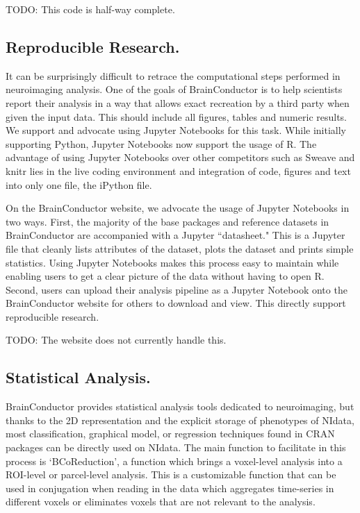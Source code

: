 \documentclass{nature}
\begin{document}
{\color{red}TODO: This code is half-way complete.} 

\subsection{Reproducible Research.}

It can be surprisingly difficult to retrace the computational steps performed
in neuroimaging analysis. One of the goals of BrainConductor is to help
scientists report their analysis in a way that allows exact recreation by
a third party when given the input data. This should include all figures,
tables and numeric results. We support and advocate using Jupyter Notebooks for
this task. While initially supporting Python, Jupyter Notebooks now support 
the usage of R. The advantage of using Jupyter Notebooks over other competitors 
such as Sweave and knitr lies in the live coding environment and 
integration of code, figures and text into only one file, the iPython file.

On the BrainConductor website, we advocate the usage of Jupyter Notebooks
in two ways. First, the majority of the base packages and reference datasets 
in BrainConductor are accompanied with a Jupyter ``datasheet." This is a 
Jupyter file that cleanly lists attributes of the dataset, plots the dataset
and prints simple statistics. Using Jupyter Notebooks makes this process easy
to maintain while enabling users to get a clear picture of the data without
having to open R. Second, users can upload their analysis pipeline as a Jupyter
Notebook onto the BrainConductor website for others to download and view. This
directly support reproducible research. 

{\color{red}TODO: The website does not currently handle this.}

\subsection{Statistical Analysis.}

BrainConductor provides statistical analysis tools dedicated to neuroimaging,
but thanks to the 2D representation and the explicit storage of
phenotypes of NIdata, most classification, graphical model, or regression
techniques
found in CRAN packages can be directly used on NIdata. The main function to
facilitate in this process is `BCoReduction', a function which brings a
voxel-level
analysis into a ROI-level or parcel-level analysis. This is a customizable
function
that can be used in conjugation when reading in the data which aggregates
time-series
in different voxels or eliminates voxels that are not relevant to the analysis.
\end{document}
